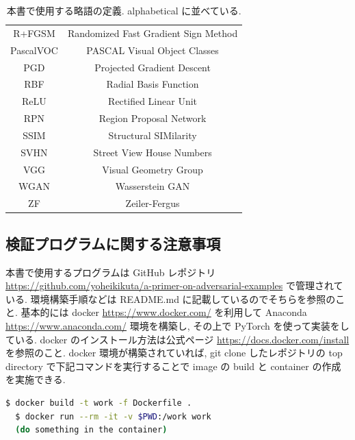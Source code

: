 \begin{table}[htbp]
\begin{center}
\begin{tabular}{c|c}
R+FGSM & Randomized Fast Gradient Sign Method \\
PascalVOC & PASCAL Visual Object Classes \\
PGD & Projected Gradient Descent \\
RBF & Radial Basis Function \\
ReLU & Rectified Linear Unit \\
RPN & Region Proposal Network \\
SSIM & Structural SIMilarity \\
SVHN & Street View House Numbers \\
VGG & Visual Geometry Group \\
WGAN & Wasserstein GAN \\
ZF & Zeiler-Fergus\\
\hline
\end{tabular}
\caption{
本書で使用する略語の定義.
alphabetical に並べている.
\label{tb:abbreviation}
}
\end{center}
\end{table}
%



\subsection{検証プログラムに関する注意事項}
\label{subsec:note_on_code}
本書で使用するプログラムは GitHub レポジトリ \href{https://github.com/yoheikikuta/a-primer-on-adversarial-examples}{https://github.com/yoheikikuta/a-primer-on-adversarial-examples} で管理されている.
環境構築手順などは README.md に記載しているのでそちらを参照のこと.
基本的には docker \href{https://www.docker.com/}{https://www.docker.com/} を利用して Anaconda \href{https://www.anaconda.com/}{https://www.anaconda.com/} 環境を構築し, その上で PyTorch \cite{paszke2019pytorch} を使って実装をしている.
docker のインストール方法は公式ページ \href{https://docs.docker.com/install}{https://docs.docker.com/install} を参照のこと.
docker 環境が構築されていれば, git clone したレポジトリの top directory で下記コマンドを実行することで image の build と container の作成を実施できる.
%
\begin{lstlisting}[language=bash]
  $ docker build -t work -f Dockerfile .
  $ docker run --rm -it -v $PWD:/work work
  (do something in the container)
\end{lstlisting}
%

